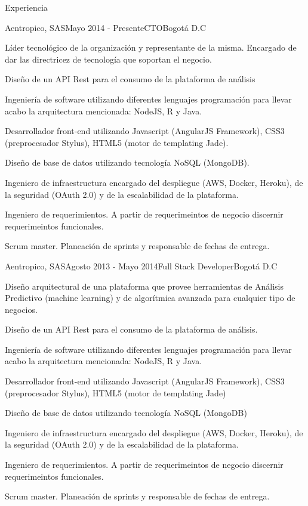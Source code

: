\documentclass[spanish]{resume} %
\begin{document}
\begin{rSection}{Experiencia}

\begin{rSubsection}{Aentropico, SAS}{Mayo 2014 - Presente}{CTO}{Bogot\'a D.C}
\item L\'ider tecnol\'ogico de la organizaci\'on y representante de la misma. Encargado de dar las directricez de tecnolog\'ia que soportan el negocio.
\item Dise\~no de un API Rest para el consumo de la plataforma de an\'alisis
\item Ingenier\'ia de software utilizando diferentes lenguajes programaci\'on para llevar acabo la arquitectura mencionada: NodeJS, R y Java.
\item Desarrollador front-end utilizando Javascript (AngularJS Framework), CSS3 (preprocesador Stylus), HTML5 (motor de templating Jade).
\item Dise\~no de base de datos utilizando tecnología NoSQL (MongoDB).
\item Ingeniero de infraestructura encargado del despliegue (AWS, Docker, Heroku), de la seguridad (OAuth 2.0) y de la escalabilidad de la plataforma. 
\item Ingeniero de requerimientos. A partir de requerimeintos de negocio discernir requerimeintos funcionales.
\item Scrum master. Planeaci\'on de sprints y responsable de fechas de entrega.
\end{rSubsection}


\begin{rSubsection}{Aentropico, SAS}{Agosto 2013 - Mayo 2014}{Full Stack Developer}{Bogot\'a D.C}
\item Dise\~no arquitectural de una plataforma que provee herramientas de An\'alisis Predictivo (machine learning) y de algor\'itmica avanzada para cualquier tipo de negocios.
\item Dise\~no de un API Rest para el consumo de la plataforma de an\'alisis.
\item Ingenier\'ia de software utilizando diferentes lenguajes programaci\'on para llevar acabo la arquitectura mencionada: NodeJS, R y Java.
\item Desarrollador front-end utilizando Javascript (AngularJS Framework), CSS3 (preprocesador Stylus), HTML5 (motor de templating Jade)
\item Dise\~no de base de datos utilizando tecnolog\'ia NoSQL (MongoDB)
\item Ingeniero de infraestructura encargado del despliegue (AWS, Docker, Heroku), de la seguridad (OAuth 2.0) y de la escalabilidad de la plataforma. 
\item Ingeniero de requerimientos. A partir de requerimeintos de negocio discernir requerimeintos funcionales.
\item Scrum master. Planeaci\'on de sprints y responsable de fechas de entrega.
\end{rSubsection}


\end{rSection}
\end{document}
